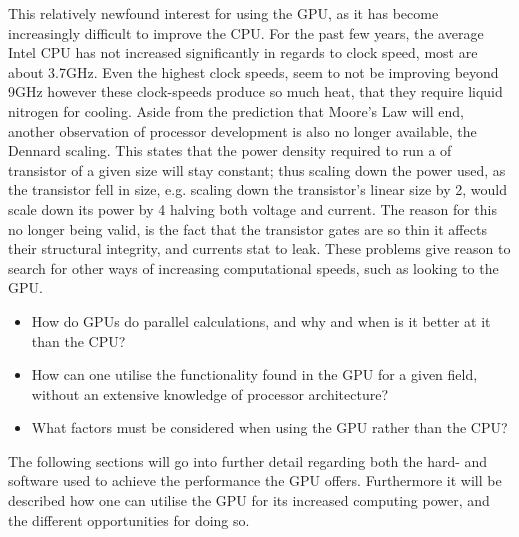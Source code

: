 This relatively newfound interest for using the GPU, as it has become increasingly difficult to improve the CPU.
For the past few years, the average Intel CPU has not increased significantly in regards to clock speed, most are about 3.7GHz.
Even the highest clock speeds, seem to not be improving beyond 9GHz however these clock-speeds produce so much heat, that they require liquid nitrogen for cooling.
Aside from the prediction that Moore's Law will end, another observation of processor development is also no longer available, the Dennard scaling.
This states that the power density required to run a of transistor of a given size will stay constant; thus scaling down the power used, as the transistor fell in size, e.g. scaling down the transistor's linear size by 2, would scale down its power by 4 halving both voltage and current. \citep{DennardScaling}
The reason for this no longer being valid, is the fact that the transistor gates are so thin it affects their structural integrity, and currents stat to leak. \citep{CPUClockSpeeds}
These problems give reason to search for other ways of increasing computational speeds, such as looking to the GPU.


\begin{itemize}
	\item How do GPUs do parallel calculations, and why and when is it better at it than the CPU?
	\item How can one utilise the functionality found in the GPU for a given field, without an extensive knowledge of processor architecture?
	\item What factors must be considered when using the GPU rather than the CPU? 
\end{itemize}

The following sections will go into further detail regarding both the hard- and software used to achieve the performance the GPU offers.
Furthermore it will be described how one can utilise the GPU for its increased computing power, and the different opportunities for doing so. 

\newpage


